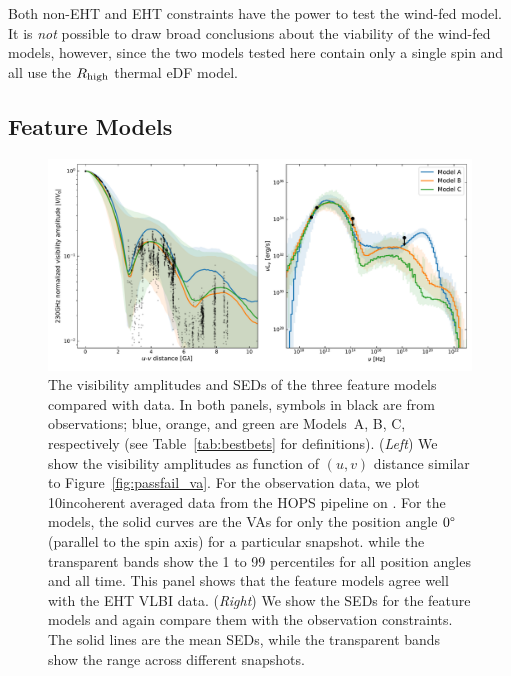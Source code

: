 Both non-EHT and EHT constraints have the power to test the wind-fed model.  It is {\em not} possible to draw broad conclusions about the viability of the wind-fed models, however, since the two models tested here contain only a single spin and all use the $R_\mathrm{high}$ thermal eDF model.

\subsection{Feature Models}
\label{sec:bestbets}

\begin{figure}
  \centering
  \includegraphics[width=\textwidth]{figures/bestbets.pdf}
  \caption{The visibility amplitudes and SEDs of the three feature
    models compared with data.
    In both panels, symbols in black are from observations; blue,
    orange, and green are Models~A, B, C, respectively (see
    Table~\ref{tab:bestbets} for definitions).
    (\emph{Left}) We show the visibility amplitudes as function of
    $(u, v)$ distance similar to Figure~\ref{fig:passfail_va}.
    For the observation data, we plot 10\sec incoherent averaged data
    from the HOPS pipeline on \aprilvii.
    For the models, the solid curves are the VAs for only the position
    angle $0\degree$ (parallel to the spin axis) for a particular
    snapshot.
    while the transparent bands show the 1 to 99 percentiles for all
    position angles and all time.
    This panel shows that the feature models agree well with the EHT
    VLBI data.
    (\emph{Right}) We show the SEDs for the feature models and again
    compare them with the observation constraints.
    The solid lines are the mean SEDs, while the transparent bands
    show the range across different snapshots.}
  \label{fig:bestbets}
\end{figure}

